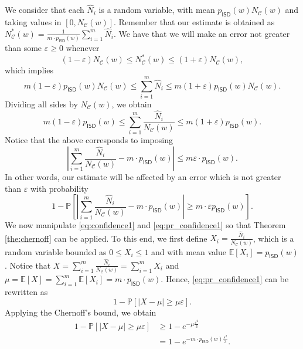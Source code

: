 \begin{IEEEproof}
We consider that each $\widehat N_i$ is a random variable, with mean $ p_{\mathsf{ISD}}(w)  N_{\mathscr C}(w)$ and taking values in $[0 , N_{\mathscr C}(w)]$.
Remember that our estimate is obtained as
$N_{\mathscr C}^*(w) = \frac{1}{m \cdot p_{\mathsf{ISD}}(w) }\sum_{i = 1}^m\widehat N_i$.
We have that we will make an error not greater than some $\varepsilon \geq 0$ whenever 
$$(1-\varepsilon)N_{\mathscr C}(w)\leq N_{\mathscr C}^*(w)\leq(1+\varepsilon)N_{\mathscr C}(w),$$
which implies
$$m(1-\varepsilon) p_{\mathsf{ISD}}(w)  N_{\mathscr C}(w)\leq\sum_{i = 1}^m\widehat N_i\leq m(1+\varepsilon) p_{\mathsf{ISD}}(w)  N_{\mathscr C}(w).$$
Dividing all sides by $N_{\mathscr C}(w)$, we obtain
$$m(1-\varepsilon) p_{\mathsf{ISD}}(w) \leq\sum_{i = 1}^m\frac{\widehat N_i}{N_{\mathscr C}(w)}\leq m(1+\varepsilon) p_{\mathsf{ISD}}(w) .$$
Notice that the above corresponds to imposing
\begin{equation}
\label{eq:confidence1}
\left|\sum_{i = 1}^m\frac{\widehat N_i}{N_{\mathscr C}(w)} - m\cdot p_{\mathsf{ISD}}(w) \right|\leq m \varepsilon \cdot  p_{\mathsf{ISD}}(w) .
\end{equation}
In other words, our estimate will be affected by an error which is not greater than $\varepsilon$ with probability
\begin{equation}
\label{eq:pr_confidence1}
1- \mathbb P\left[\left|\sum_{i = 1}^m\frac{\widehat N_i}{N_{\mathscr C}(w)} - m\cdot  p_{\mathsf{ISD}}(w) \right|\geq m \cdot \varepsilon  p_{\mathsf{ISD}}(w) \right].
\end{equation}
We now manipulate \eqref{eq:confidence1} and \eqref{eq:pr_confidence1} so that Theorem \ref{the:chernoff} can be applied.
To this end, we first define $X_i = \frac{\widehat N_i}{N_{\mathscr C}(w)}$, which is a random variable bounded as $0\leq X_i\leq 1$ and with mean value $\mathbb E[X_i] =  p_{\mathsf{ISD}}(w) $.
Notice that $X = \sum_{i = 1}^m\frac{\widehat N_i}{N_{\mathscr C}(w)} = \sum_{i = 1}^m X_i$ and $\mu = \mathbb E[X] = \sum_{i = 1}^m\mathbb E[X_i] = m\cdot  p_{\mathsf{ISD}}(w) $.
Hence, \eqref{eq:pr_confidence1} can be rewritten as
\begin{equation}
\label{eq:pr_confidence2}
1- \mathbb P\left[\left|X - \mu\right|\geq  \mu\varepsilon\right].
\end{equation}
Applying the Chernoff's bound, we obtain
\begin{align*}
1 - \mathbb P\left[\left|X - \mu\right|\geq  \mu\varepsilon\right]&\nonumber \geq 1- e^{-\mu\frac{\varepsilon^2}{3}}\\\nonumber
& = 1-e^{-m\cdot  p_{\mathsf{ISD}}(w) \frac{\varepsilon^2}{3}}.
\end{align*}
\end{IEEEproof}

